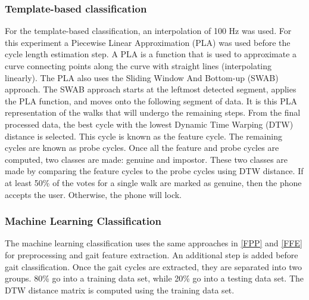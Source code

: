 \documentclass{sig-alternate}
\begin{document}
\subsubsection{Template-based classification}
	 For the template-based classification, an interpolation of 100 Hz was used. For this experiment a Piecewise Linear Approximation (PLA) was used before the cycle length estimation step. A PLA is a function that is used to approximate a curve connecting points along the curve with straight lines (interpolating linearly). The PLA also uses the Sliding Window And Bottom-up (SWAB) approach. The SWAB approach starts at the leftmost detected segment, applies the PLA function, and moves onto the following segment of data. It is this PLA representation of the walks that will undergo the remaining steps. From the final processed data, the best cycle with the lowest Dynamic Time Warping (DTW) distance is selected. This cycle is known as the feature cycle. The remaining cycles are known as probe cycles. Once all the feature and probe cycles are computed, two classes are made: genuine and impostor. These two classes are made by comparing the feature cycles to the probe cycles using DTW distance. If at least 50\% of the votes for a single walk are marked as genuine, then the phone accepts the user. Otherwise, the phone will lock.


\subsubsection{Machine Learning Classification}
	The machine learning classification uses the same approaches in \ref{FPP} and \ref{FFE} for preprocessing and gait feature extraction. An additional step is added before gait classification. Once the gait cycles are extracted, they are separated into two groups. 80\% go into a training data set, while 20\% go into a testing data set. The DTW distance matrix is computed using the training data set.
\end{document}
